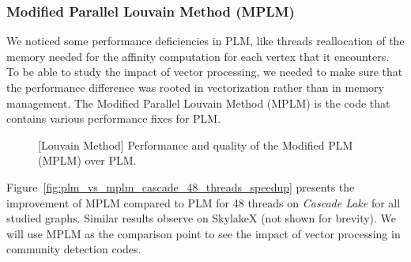 \documentclass[default,iicol]{sn-jnl}%
\theoremstyle{thmstyleone}%
\theoremstyle{thmstyletwo}%
\theoremstyle{thmstylethree}%
\begin{document}
\subsubsection{Modified Parallel Louvain Method (MPLM)}
\label{sec:mplm:compare}
We noticed some performance deficiencies in PLM, like threads reallocation of 
the memory needed for the affinity computation for each vertex that it encounters. To be able to study the impact of vector 
processing, we needed to make sure that the performance difference was rooted in vectorization rather than in memory 
management. The Modified Parallel Louvain Method (MPLM) is the code that contains various performance fixes for PLM.
\begin{figure}[t]
	\centering
	\caption{[Louvain Method] Performance and quality of the Modified PLM (MPLM) over PLM.}
  \label{fig:sanity_check_on_cascade_lake_48}
  
\end{figure}

Figure~\ref{fig:plm_vs_mplm_cascade_48_threads_speedup} presents the improvement of MPLM compared to PLM for 48 threads 
on \textit{Cascade Lake} for all studied graphs. Similar results observe on SkylakeX (not shown for brevity). We will use MPLM as 
the comparison point to see the impact of vector processing in community detection codes. 
\end{document}
